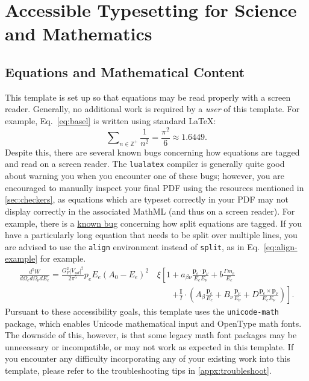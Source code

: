 \chapter{Accessible Typesetting for Science and Mathematics}
\section{Equations and Mathematical Content}
This template is set up so that equations may be read properly with a screen reader.
Generally, no additional work is required by a \textit{user} of this template.
For example, Eq.~\eqref{eq:basel} is written using standard \LaTeX:
\begin{equation}
  \label{eq:basel}
  \sum\nolimits_{n\in \mathbb{Z}^+} \frac{1}{n^2}
  = \frac{\pi^2}{6}
  \approx 1.6449.
\end{equation}
Despite this, there are several known bugs concerning how equations are tagged and read on a screen reader.
The \texttt{lualatex} compiler is generally quite good about warning you when you encounter one of these bugs; however, you are encouraged to manually inspect your final PDF using the resources mentioned in \autoref{sec:checkers}, as equations which are typeset correctly in your PDF may not display correctly in the associated MathML (and thus on a screen reader).
For example, there is a \href{https://github.com/latex3/tagging-project/issues/1033}{known bug} concerning how split equations are tagged.
If you have a particularly long equation that needs to be split over multiple lines, you are advised to use the \texttt{align} environment instead of \texttt{split}, as in Eq.~\eqref{eq:align-example} for example.
\begin{align}
  \label{eq:align-example}
  \frac{d^5W}{d\Omega_e d\Omega_\nu dE_e}
  = \frac{G_F^2|V_{ud}|^2}{2\pi^5}p_eE_e(A_0-E_e)^2
  &\,\xi\left[1+a_{\beta\nu}\frac{\symbf{p}_e\cdot\symbf{p}_\nu}{E_eE_\nu}+b\frac{\Gamma m_e}{E_e}\right.\nonumber\\
  &\qquad\left.+\frac{\symbf{I}}{I}\cdot\left(A_\beta\frac{\symbf{p}_e}{E_e}+B_\nu\frac{\symbf{p}_\nu}{E_\nu}+D\frac{\symbf{p}_e\times\symbf{p}_\nu}{E_e E_\nu}\right)\right].
\end{align}
Pursuant to these accessibility goals, this template uses the \texttt{unicode-math} package, which enables Unicode mathematical input and OpenType math fonts.
The downside of this, however, is that some legacy math font packages may be unnecessary or incompatible, or may not work as expected in this template.
If you encounter any difficulty incorporating any of your existing work into this template, please refer to the troubleshooting tips in \ref{appx:troubleshoot}.

